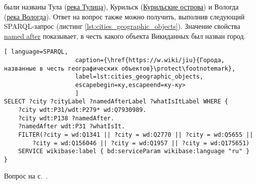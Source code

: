 \begin{task}
    \label{answer:cities_geographic_objects}
     были названы Тула (\href{https://bit.ly/36pMqht}{река Тулица}), Курильск (\href{https://bit.ly/3pbEr0p}{Курильские острова}) и Вологда (\href{https://bit.ly/3lipZB3}{река Вологда}). Ответ на вопрос также можно получить, выполнив следующий SPARQL-запрос (листинг \ref{lst:cities_geographic_objects}). Значение свойства \href{https://www.wikidata.org/wiki/Property:P138}{named after} показывает, в честь какого объекта Викиданных был назван город.
    
    
    \begin{lstlisting}[ language=SPARQL, 
                    caption={\href{https://w.wiki/jiu}{Города, названные в честь географических объектов}\protect\footnotemark},
                    label=lst:cities_geographic_objects, 
                    escapebegin=ку,escapeend=ку-ку>
                    ]
SELECT ?city ?cityLabel ?namedAfterLabel ?whatIsItLabel WHERE {
	?city wdt:P31/wdt:P279* wd:Q7930989.
	?city wdt:P138 ?namedAfter.
	?namedAfter wdt:P31 ?whatIsIt.
	FILTER(?city = wd:Q1341 || ?city = wd:Q2770 || ?city = wd:Q5655 ||
		?city = wd:Q156046 || ?city = wd:Q1957 || ?city = wd:Q175651)
	SERVICE wikibase:label { bd:serviceParam wikibase:language "ru" }
}
    \end{lstlisting}
    \small{Вопрос на с.~\pageref{lst:population_town}.}
\end{task}

